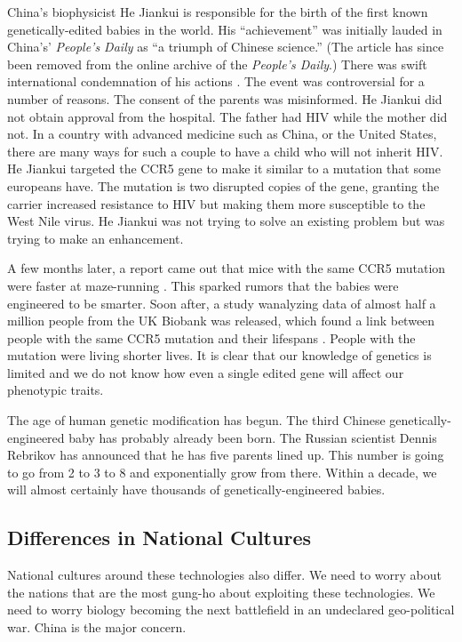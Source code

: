 China's biophysicist He Jiankui is responsible for the birth of the first known genetically-edited babies in the world.
His ``achievement'' was initially lauded in China's' \textit{People's Daily} as ``a triumph of Chinese science.''
(The article has since been removed from the online archive of the \textit{People's Daily}.)
There was swift international condemnation of his actions \cite{crisprbabies2018}.
The event was controversial for a number of reasons.
The consent of the parents was misinformed.
He Jiankui did not obtain approval from the hospital.
The father had HIV while the mother did not.
In a country with advanced medicine such as China, or the United States, there are many ways for such a couple to have a child who will not inherit HIV.
He Jiankui targeted the CCR5 gene to make it similar to a mutation that some europeans have.
The mutation is two disrupted copies of the gene, granting the carrier increased resistance to HIV but making them more susceptible to the West Nile virus.
He Jiankui was not trying to solve an existing problem but was trying to make an enhancement.

A few months later, a report came out that mice with the same CCR5 mutation were faster at maze-running \cite{Regalado2019}.
This sparked rumors that the babies were engineered to be smarter.
Soon after, a study wanalyzing data of almost half a million people from the UK Biobank was released, which found a link between people with the same CCR5 mutation and their lifespans \cite{Wei2019}.
People with the mutation were living shorter lives.
It is clear that our knowledge of genetics is limited and we do not know how even a single edited gene will affect our phenotypic traits.

The age of human genetic modification has begun.
The third Chinese genetically-engineered baby has probably already been born.
The Russian scientist Dennis Rebrikov has announced that he has five parents lined up.
This number is going to go from 2 to 3 to 8 and exponentially grow from there.
Within a decade, we will almost certainly have thousands of genetically-engineered babies.

\subsection{Differences in National Cultures}

National cultures around these technologies also differ.
We need to worry about the nations that are the most gung-ho about exploiting these technologies.
We need to worry biology becoming the next battlefield in an undeclared geo-political war.
China is the major concern.

